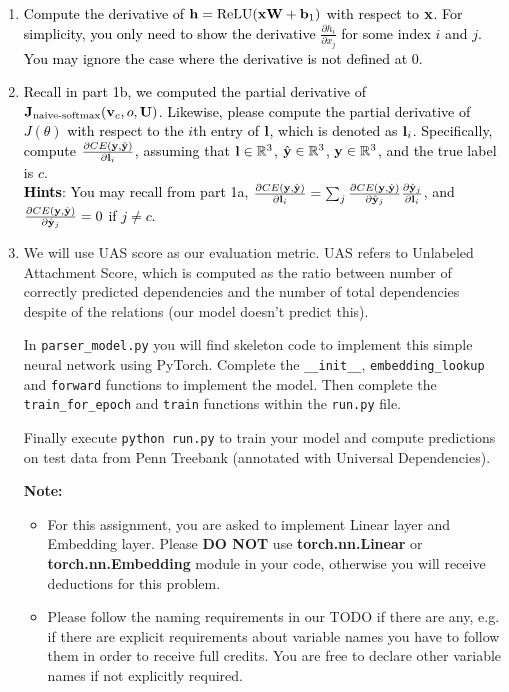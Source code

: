 \begin{parts}
\begin{enumerate}[label=\roman*.]
        \item \textcolor{black}{Compute the derivative of $\mathbf{h} = \operatorname{ReLU}(\mathbf{x} \mathbf{W} + \mathbf{b}_1)$ with respect to $\mathbf{x}$. For simplicity, you only need to show the derivative $\frac{\partial h_i}{\partial x_j}$ for some index $i$ and $j$. You may ignore the case where the derivative is not defined at 0.}
        \item \textcolor{black}{Recall in part 1b, we computed the partial derivative of $\mathbf{J}_{\text{naive-softmax}}(\mathbf{v}_c, o, \mathbf{U})$. Likewise, please compute the partial derivative of $J(\theta)$ with respect to the $i$th entry of $\mathbf{l}$, which is denoted as $\mathbf{l}_i$. Specifically, compute $\frac{\partial CE(\mathbf{y}, \hat{\mathbf{y}})}{\partial \mathbf{l}_i}$, assuming that $\mathbf{l} \in \mathbb{R}^3$, $\hat{\mathbf{y}} \in \mathbb{R}^3$, $\mathbf{y} \in \mathbb{R}^3$, and the true label is $c$. \\
        \textbf{Hints}: You may recall from part 1a, $\frac{\partial CE(\mathbf{y}, \hat{\mathbf{y}})}{\partial \mathbf{l}_i} = \sum_j \frac{\partial CE(\mathbf{y}, \hat{\mathbf{y}})}{\partial \hat{\mathbf{y}}_j}\frac{\partial \hat{\mathbf{y}}_j}{\partial \mathbf{l}_i}$, and $\frac{\partial CE(\mathbf{y}, \hat{\mathbf{y}})}{\partial \hat{\mathbf{y}}_j}=0$ if $j \neq c$. 
        }
        \item We will use UAS score as our evaluation metric. UAS refers to Unlabeled Attachment Score, which is computed as the ratio between number of correctly predicted dependencies and the number of total dependencies despite of the relations (our model doesn't predict this).\newline
    
   In \texttt{parser\_model.py} you will find skeleton code to implement this simple neural network using PyTorch. Complete the \texttt{\_\_init\_\_}, \texttt{embedding\_lookup} and \texttt{forward} functions to implement the model. Then complete the \texttt{train\_for\_epoch} and \texttt{train} functions within the \texttt{run.py} file.
   
    Finally execute \texttt{python run.py} to train your model and compute predictions
    on test data from Penn Treebank (annotated with Universal Dependencies). 
    
    \textbf{Note:}
    \begin{itemize}
        \item For this assignment, you are asked to implement Linear layer and Embedding layer. Please \textbf{DO NOT} use \textbf{torch.nn.Linear} or  \textbf{torch.nn.Embedding} module in your code, otherwise you will receive deductions for this problem. 
        \item Please follow the naming requirements in our TODO if there are any, e.g. if there are explicit requirements about variable names you have to follow them in order to receive full credits. You are free to declare other variable names if not explicitly required. 
    \end{itemize}
    

\end{enumerate}
\end{parts}
